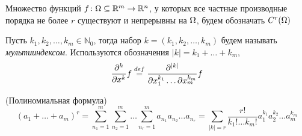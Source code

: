 \begin{definition}
    Множество функций $f \colon \Omega \subseteq \mathbb{R}^m \to \mathbb{R}^n$, у которых все частные
    производные порядка не более $r$ существуют и непрерывны на $\Omega$, будем
    обозначать $C^r(\Omega)$
\end{definition}

\begin{definition}
    Пусть $k_1, k_2, \ldots, k_m \in \mathbb{N}_0$, тогда набор
    $k = (k_1, k_2, \ldots, k_m)$ будем называть \textit{мультииндексом}.
    Используются обозначения $|k| = k_1 + \ldots + k_m$,
\[
    \frac{\partial^k}{\partial x^k}f \overset{def}{\underset{}{=}}
    \frac{\partial^{|k|}}{\partial x_1^{k_1} \ldots \partial x_m^{k_m}}f
\]
\end{definition}

\begin{lemma}(Полиномиальная формула)
\[
    (a_1 + \ldots + a_m)^r = \sum_{n_1 = 1}^{m}{\sum_{n_2 = 1}^{m}{\ldots
    \sum_{n_r = 1}^{m}{a_{n_1} a_{n_2} \ldots a_{n_r}}}} =
    \sum_{|k| = r}{\frac{r!}{k_1! \ldots k_m!} a_1^{k_1} a_2^{k_2} \ldots
    a_m^{k_m}}
\]
\end{lemma}
